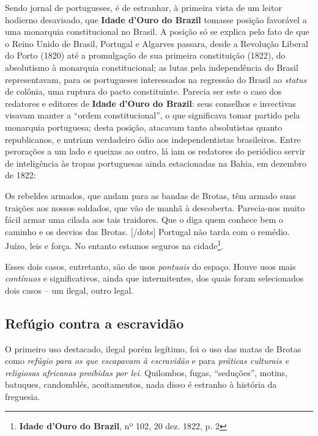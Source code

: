 Sendo jornal de portugueses, é de estranhar, à primeira vista de um leitor hodierno desavisado, que \textbf{Idade d'Ouro do Brazil} tomasse posição favorável a uma monarquia constitucional no Brasil. A posição só se explica pelo fato de que o Reino Unido de Brasil, Portugal e Algarves passara, desde a Revolução Liberal do Porto (1820) até a promulgação de sua primeira constituição (1822), do absolutismo à monarquia constitucional; as lutas pela independência do Brasil representavam, para os portugueses interessados na regressão do Brasil ao \textit{status} de colônia, uma ruptura do pacto constituinte. Parecia ser este o caso dos redatores e editores de \textbf{Idade d'Ouro do Brazil}: seus conselhos e invectivas visavam manter a ``ordem constitucional'', o que significava tomar partido pela monarquia portuguesa; desta posição, atacavam tanto absolutistas quanto republicanos, e nutriam verdadeiro ódio aos independentistas brasileiros. Entre perorações a um lado e queixas ao outro, lá iam os redatores do periódico servir de inteligência às tropas portuguesas ainda estacionadas na Bahia, em dezembro de 1822:

\begin{citacao}
Os rebeldes armados, que andam para as bandas de Brotas, têm armado suas traições aos nossos soldados, que vão de manhã à descoberta. Parecia-nos muito fácil armar uma cilada aos tais traidores. Que o diga quem conhece bem o caminho e os desvios das Brotas. [/dots] Portugal não tarda com o remédio. Juízo, leis e força. No entanto estamos seguros na cidade\footnote{\textbf{Idade d'Ouro do Brazil}, nº 102, 20 dez. 1822, p. 2}.
\end{citacao}



Esses dois casos, entretanto, são de usos \textit{pontuais} do espaço. Houve usos mais \textit{contínuos} e significativos, ainda que intermitentes, dos quais foram selecionados dois casos -- um ilegal, outro legal.

\subsection{Refúgio contra a escravidão}

O primeiro uso destacado, ilegal porém legítimo, foi o uso das matas de Brotas como \textit{refúgio para os que escapavam à escravidão} e para \textit{práticas culturais e religiosas africanas proibidas por lei}. Quilombos, fugas, ``seduções'', motins, batuques, candomblés, acoitamentos, nada disso é estranho à história da freguesia.

